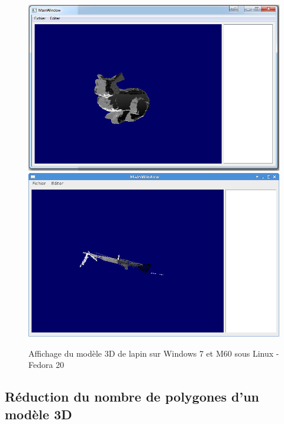 \begin{figure}[h]
		\centering
		\includegraphics[scale=0.26]{proto_lapin_win7.png}
                \includegraphics[scale=0.27]{proto_m60_linux.png}
		\caption{\label{fig:proto_porta} Affichage du modèle 3D de lapin sur Windows 7 et M60 sous Linux - Fedora 20 }
\end{figure}

\subsection{Réduction du nombre de polygones d’un modèle 3D}

